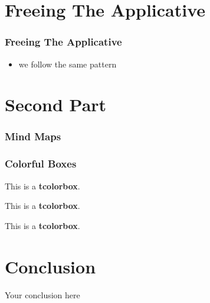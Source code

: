 \documentclass{beamer}
\begin{document}
\section{Freeing The Applicative}\label{sec:free-applicative}

\begin{frame}
  \frametitle{Freeing The Applicative}
  \begin{itemize}
  \item we follow the same pattern
  \end{itemize}
\end{frame}

\section{Second Part}

\begin{frame}
  \frametitle{Mind Maps}
  \begin{center}
    \resizebox{0.8\textwidth}{!}{}
  \end{center}
\end{frame}

\begin{frame}
  \frametitle{Colorful Boxes}
  \begin{tcolorbox}[
    fonttitle=\sffamily\bfseries\large,
    colbacktitle=black,
    colframe=black,
    coltitle=beamer@centricgreen,
    title=Hello World
    ]
    This is a \textbf{tcolorbox}.
  \end{tcolorbox}
  \begin{tcolorbox}[
    fonttitle=\sffamily\bfseries\large,
    colbacktitle=black,
    colframe=black,
    coltitle=beamer@codeblue,
    title=Hello World
    ]
    This is a \textbf{tcolorbox}.
  \end{tcolorbox}
  \begin{tcolorbox}[
    fonttitle=\sffamily\bfseries\large,
    colbacktitle=black,
    colframe=black,
    title=Hello World
    ]
    This is a \textbf{tcolorbox}.
  \end{tcolorbox}
\end{frame}

\section{Conclusion}\label{sec:conclusion}

\begin{frame}
  \begin{center}
    \huge
    Your conclusion here
  \end{center}
\end{frame}
\end{document}
